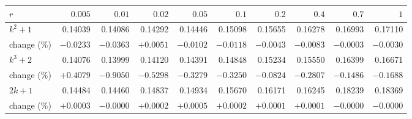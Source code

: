 \begin{tabular}{lrrrrrrrrr}
\toprule
$r$ & $0.005$ & $0.01$ & $0.02$ & $0.05$ & $0.1$ & $0.2$ & $0.4$ & $0.7$ & $1$ \\
\midrule
$k^2+1$ & 0.14039 & 0.14086 & 0.14292 & 0.14446 & 0.15098 & 0.15655 & 0.16278 & 0.16993 & 0.17110 \\
\quad change (\%) & $-0.0233$ & $-0.0363$ & $+0.0051$ & $-0.0102$ & $-0.0118$ & $-0.0043$ & $-0.0083$ & $-0.0003$ & $-0.0030$ \\
$k^3+2$ & 0.14076 & 0.13999 & 0.14120 & 0.14391 & 0.14848 & 0.15234 & 0.15550 & 0.16399 & 0.16671 \\
\quad change (\%) & $+0.4079$ & $-0.9050$ & $-0.5298$ & $-0.3279$ & $-0.3250$ & $-0.0824$ & $-0.2807$ & $-0.1486$ & $-0.1688$ \\
$2k+1$ & 0.14484 & 0.14460 & 0.14837 & 0.14934 & 0.15670 & 0.16171 & 0.16245 & 0.18239 & 0.18369 \\
\quad change (\%) & $+0.0003$ & $-0.0000$ & $+0.0002$ & $+0.0005$ & $+0.0002$ & $+0.0001$ & $+0.0001$ & $-0.0000$ & $-0.0000$ \\
\bottomrule
\end{tabular}
